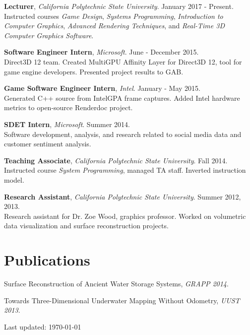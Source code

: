 \documentclass[letterpaper]{article}
\renewenvironment{itemize}{
  \begin{list}{}{
    \setlength{\leftmargin}{1.5em}
  }
}{
  \end{list}
}
\begin{document}
\begin{itemize}
\item {\bf Lecturer}, {\it California Polytechnic State University}. January 2017 - Present. \\
  Instructed courses {\it Game Design}, {\it Systems Programming}, {\it Introduction to Computer Graphics}, {\it Advanced Rendering Techniques}, and {\it Real-Time 3D Computer Graphics Software}.

\item {\bf Software Engineer Intern}, {\it Microsoft}. June - December 2015. \\
  Direct3D 12 team. Created MultiGPU Affinity Layer for Direct3D 12, tool for game engine developers. Presented project results to GAB.

\item {\bf Game Software Engineer Intern}, {\it Intel}. January - May 2015. \\
  Generated C++ source from IntelGPA frame captures. Added Intel hardware metrics to open-source Renderdoc project.

\item {\bf SDET Intern}, {\it Microsoft}. Summer 2014. \\
  Software development, analysis, and research related to social media data and customer sentiment analysis.

\item {\bf Teaching Associate}, {\it California Polytechnic State University}. Fall 2014. \\
  Instructed course {\it System Programming}, managed TA staff. Inverted instruction model.

\item {\bf Research Assistant}, {\it California Polytechnic State University}. Summer 2012, 2013. \\
  Research assistant for Dr. Zoe Wood, graphics professor.
  Worked on volumetric data visualization and surface reconstruction projects.

\end{itemize}


\section*{Publications}

\begin{itemize}
\item Surface Reconstruction of Ancient Water Storage Systems, {\it GRAPP 2014}.
\item Towards Three-Dimensional Underwater Mapping Without Odometry, {\it UUST 2013}.
\end{itemize}

\bigskip

\begin{center}
  \begin{footnotesize}
    Last updated: \today \\
  \end{footnotesize}
\end{center}
\end{document}
